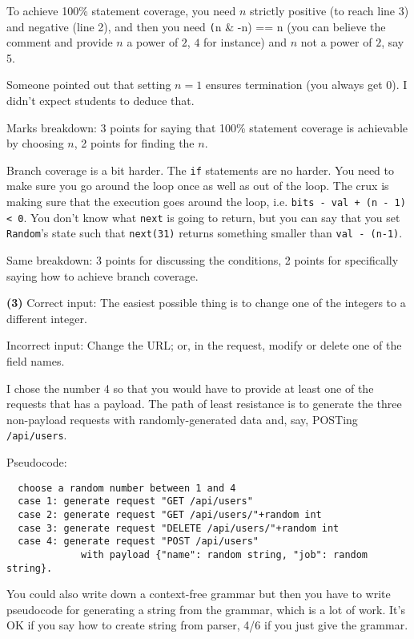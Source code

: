 \documentclass[11pt,onecolumn,letterpaper]{article}
\newcounter{qNum}
\newcommand{\q}[1]{%
\textbf{(#1)}\stepcounter{qNum}}
\begin{document}
To achieve 100\% statement coverage, you need $n$ strictly positive
(to reach line 3) and negative (line 2), and then you need {\texttt (n
  \& -n) == n} (you can believe the comment and provide $n$ a power of
$2$, $4$ for instance) and $n$ not a power of $2$, say 5.

Someone pointed out that setting $n=1$ ensures termination (you always get 0).
I didn't expect students to deduce that.

Marks breakdown: 3 points for saying that 100\% statement coverage
is achievable by choosing $n$, 2 points for finding the $n$.

Branch coverage is a bit harder. The {\tt if} statements are no harder. You need to make sure you go
around the loop once as well as out of the loop. The crux is making sure that the execution
goes around the loop, i.e. {\tt bits - val + (n - 1) < 0}. You don't know what {\tt next} is going to return,
but you can say that you set {\tt Random}'s state such that {\tt next(31)} returns something smaller than
{\tt val - (n-1)}. 

Same breakdown: 3 points for discussing the conditions, 2 points for specifically
saying how to achieve branch coverage.

\q{3}
Correct input: The easiest possible thing is to change one of the integers to a
different integer.

Incorrect input: Change the URL; or, in the request, modify or delete one of the field names.

I chose the number 4 so that you would have to provide at least one of the requests
that has a payload. The path of least resistance is to generate the three non-payload
requests with randomly-generated data and, say, POSTing {\tt /api/users}.

Pseudocode:
\begin{verbatim}
  choose a random number between 1 and 4
  case 1: generate request "GET /api/users"
  case 2: generate request "GET /api/users/"+random int
  case 3: generate request "DELETE /api/users/"+random int
  case 4: generate request "POST /api/users" 
             with payload {"name": random string, "job": random string}.
\end{verbatim}

You could also write down a context-free grammar but then you have to write
pseudocode for generating a string from the grammar, which is a lot of work.
It's OK if you say how to create string from parser, 4/6 if you just give the grammar.
\end{document}
